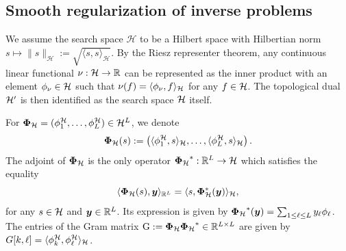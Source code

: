 \documentclass[12pt]{article}
\begin{document}
    
    \subsection{Smooth regularization of inverse problems}

    {We assume the search space $\mathcal{H}$ to be a Hilbert space with Hilbertian norm $s \mapsto \| s \|_\mathcal{H} := \sqrt{\langle s, s \rangle_{\mathcal{H}}}$. By the Riesz representer theorem, any continuous linear functional $\nu: \mathcal{H} \to \mathbb{R}$ can be represented as the inner product with an element $\phi_\nu \in \mathcal{H}$ such that $\nu(f) = \langle \phi_\nu, f \rangle_{\mathcal{H}}$ for any $f \in \mathcal{H}$. The topological dual $\mathcal{H}'$ is then identified as the search space $\mathcal{H}$ itself.}

    {
    For ${\bm{\Phi}_\mathcal{H}}= (\phi^\mathcal{H}_1 ,\ldots , \phi^\mathcal{H}_L) \in \mathcal{H}^L$, we denote
    \begin{equation}
        {\bm{\Phi}_\mathcal{H}}(s) := \left( \langle \phi^\mathcal{H}_1, s \rangle_{\mathcal{H}} , \ldots , \langle \phi^\mathcal{H}_L, s \rangle_{\mathcal{H}} \right). 
        \label{eq:phi-hilbert}
    \end{equation}
    The adjoint of ${\bm{\Phi}_\mathcal{H}}$ is the only operator ${\bm{\Phi}_\mathcal{H}}^* : \mathbb{R}^L \rightarrow \mathcal{H}$ which satisfies the equality %
    \begin{equation*}
        \langle \bm{\Phi}_\mathcal{H}(s), \bm{y}\rangle_{\mathbb{R}^L} = \langle s, \bm{\Phi}_\mathcal{H}^*(\bm{y})\rangle_{\mathcal{H}},
    \end{equation*}
    for any $s \in \mathcal{H}$ and $\bm{y}\in\mathbb{R}^L$.
    Its expression is given by ${\bm{\Phi}_\mathcal{H}}^* (\bm{y}) = \sum_{1 \leq \ell \leq L} y_\ell \phi_\ell$.
    The entries of the Gram matrix $\mathrm{G} := {\bm{\Phi}_\mathcal{H}} {\bm{\Phi}_\mathcal{H}}^* \in \mathbb{R}^{L\times L}$ are given by $G[k,\ell] = \langle \phi^\mathcal{H}_k , \phi_\ell^{\mathcal{H}} \rangle_{\mathcal{H}}$.}
\end{document}
